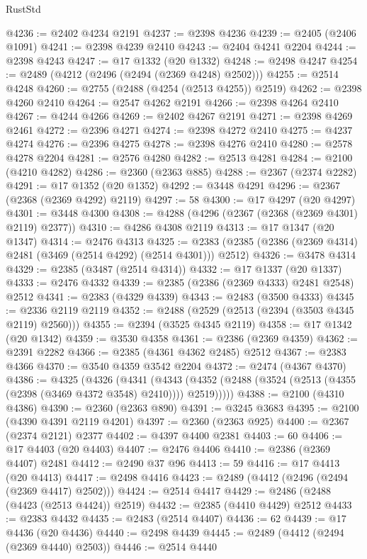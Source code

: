 \begin{lexlean}{RustStd}
\begin{coremodule}
{\begin{coremodule}
{{{{{{{{{{{{{{{{{{{{{{{{{{{{{{{{{{{{{{{{{{{{{{{{{{@4236 := @2402 @4234 @2191
@4237 := @2398 @4236
@4239 := @2405 (@2406 @1091)
@4241 := @2398 @4239 @2410
@4243 := @2404 @4241 @2204
@4244 := @2398 @4243
@4247 := @17 @1332 (@20 @1332)
@4248 := @2498 @4247
@4254 := @2489 (@4212 (@2496 (@2494 (@2369 @4248) @2502)))
@4255 := @2514 @4248
@4260 := @2755 (@2488 (@4254 (@2513 @4255)) @2519)
@4262 := @2398 @4260 @2410
@4264 := @2547 @4262 @2191
@4266 := @2398 @4264 @2410
@4267 := @4244 @4266
@4269 := @2402 @4267 @2191
@4271 := @2398 @4269 @2461
@4272 := @2396 @4271
@4274 := @2398 @4272 @2410
@4275 := @4237 @4274
@4276 := @2396 @4275
@4278 := @2398 @4276 @2410
@4280 := @2578 @4278 @2204
@4281 := @2576 @4280
@4282 := @2513 @4281
@4284 := @2100 (@4210 @4282)
@4286 := @2360 (@2363 @885)
@4288 := @2367 (@2374 @2282)
@4291 := @17 @1352 (@20 @1352)
@4292 := @3448 @4291
@4296 := @2367 (@2368 (@2369 @4292) @2119)
@4297 := 58
@4300 := @17 @4297 (@20 @4297)
@4301 := @3448 @4300
@4308 := @4288 (@4296 (@2367 (@2368 (@2369 @4301) @2119) @2377))
@4310 := @4286 @4308 @2119
@4313 := @17 @1347 (@20 @1347)
@4314 := @2476 @4313
@4325 := @2383 (@2385 (@2386 (@2369 @4314) @2481 (@3469 (@2514 @4292) (@2514 @4301))) @2512)
@4326 := @3478 @4314
@4329 := @2385 (@3487 (@2514 @4314))
@4332 := @17 @1337 (@20 @1337)
@4333 := @2476 @4332
@4339 := @2385 (@2386 (@2369 @4333) @2481 @2548) @2512
@4341 := @2383 (@4329 @4339)
@4343 := @2483 (@3500 @4333)
@4345 := @2336 @2119 @2119
@4352 := @2488 (@2529 (@2513 (@2394 (@3503 @4345 @2119) @2560)))
@4355 := @2394 (@3525 @4345 @2119)
@4358 := @17 @1342 (@20 @1342)
@4359 := @3530 @4358
@4361 := @2386 (@2369 @4359)
@4362 := @2391 @2282
@4366 := @2385 (@4361 @4362 @2485) @2512
@4367 := @2383 @4366
@4370 := @3540 @4359 @3542 @2204
@4372 := @2474 (@4367 @4370)
@4386 := @4325
    (@4326
      (@4341
        (@4343 (@4352 (@2488 (@3524 (@2513 (@4355 (@2398 (@3469 @4372 @3548) @2410)))) @2519)))))
@4388 := @2100 (@4310 @4386)
@4390 := @2360 (@2363 @890)
@4391 := @3245 @3683
@4395 := @2100 (@4390 @4391 @2119 @4201)
@4397 := @2360 (@2363 @925)
@4400 := @2367 (@2374 @2121) @2377
@4402 := @4397 @4400 @2381
@4403 := 60
@4406 := @17 @4403 (@20 @4403)
@4407 := @2476 @4406
@4410 := @2386 (@2369 @4407) @2481
@4412 := @2490 @37 @96
@4413 := 59
@4416 := @17 @4413 (@20 @4413)
@4417 := @2498 @4416
@4423 := @2489 (@4412 (@2496 (@2494 (@2369 @4417) @2502)))
@4424 := @2514 @4417
@4429 := @2486 (@2488 (@4423 (@2513 @4424)) @2519)
@4432 := @2385 (@4410 @4429) @2512
@4433 := @2383 @4432
@4435 := @2483 (@2514 @4407)
@4436 := 62
@4439 := @17 @4436 (@20 @4436)
@4440 := @2498 @4439
@4445 := @2489 (@4412 (@2494 (@2369 @4440) @2503))
@4446 := @2514 @4440
}}}}}}}}}}}}}}}}}}}}}}}}}}}}}}}}}}}}}}}}}}}}}}}}}}
\end{coremodule}}
\end{coremodule}
\end{lexlean}
